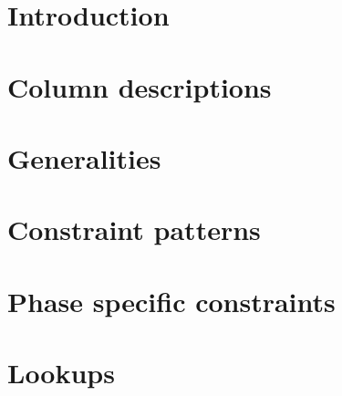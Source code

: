 

\section{Introduction}                   \label{rlptxn: intro}                           
\section{Column descriptions}            \label{rlptxn: column descriptions}             
\section{Generalities}                   \label{rlptxn: generalities}                    
\section{Constraint patterns}            \label{rlptxn: constraint patterns}             
\section{Phase specific constraints}     \label{rlptxn: phase specific constraints}      
\section{Lookups}                        \label{rlptxn: lookups}                         
